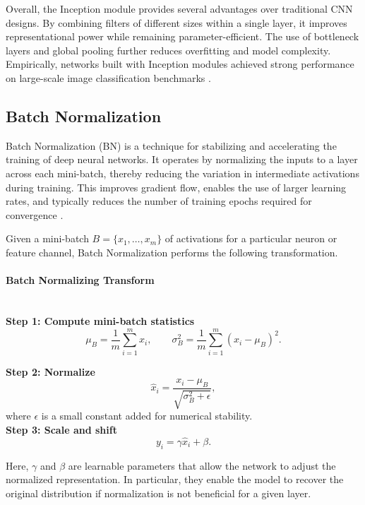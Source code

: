 \documentclass{article}
\begin{document}
Overall, the Inception module provides several advantages over traditional 
CNN designs. By combining filters of different sizes within a single layer, 
it improves representational power while remaining parameter-efficient. 
The use of bottleneck layers and global pooling further reduces overfitting 
and model complexity. Empirically, networks built with Inception modules 
achieved strong performance on large-scale image classification benchmarks \cite{szegedy2014goingdeeperconvolutions}.

\subsection{Batch Normalization}

Batch Normalization (BN) is a technique for stabilizing and accelerating the 
training of deep neural networks. It operates by normalizing the inputs to a 
layer across each mini-batch, thereby reducing the variation in intermediate 
activations during training. This improves gradient flow, enables the use of 
larger learning rates, and typically reduces the number of training epochs 
required for convergence \cite{alregib2024neural}.

Given a mini-batch $B = \{x_1, \dots, x_m\}$ of activations for a particular 
neuron or feature channel, Batch Normalization performs the following 
transformation.

\paragraph{Batch Normalizing Transform}\mbox{}\\[4pt]

\textbf{Step 1: Compute mini-batch statistics}
\[
\mu_B = \frac{1}{m} \sum_{i=1}^{m} x_i,
\qquad
\sigma_B^2 = \frac{1}{m} \sum_{i=1}^{m} (x_i - \mu_B)^2.
\]

\textbf{Step 2: Normalize}
\[
\hat{x}_i = \frac{x_i - \mu_B}{\sqrt{\sigma_B^2 + \epsilon}},
\]
where $\epsilon$ is a small constant added for numerical stability.
\mbox{}\\[2pt]

\textbf{Step 3: Scale and shift}
\[
y_i = \gamma \hat{x}_i + \beta.
\]

Here, $\gamma$ and $\beta$ are learnable parameters that allow the network 
to adjust the normalized representation. In particular, they enable the model 
to recover the original distribution if normalization is not beneficial for 
a given layer.
\end{document}
